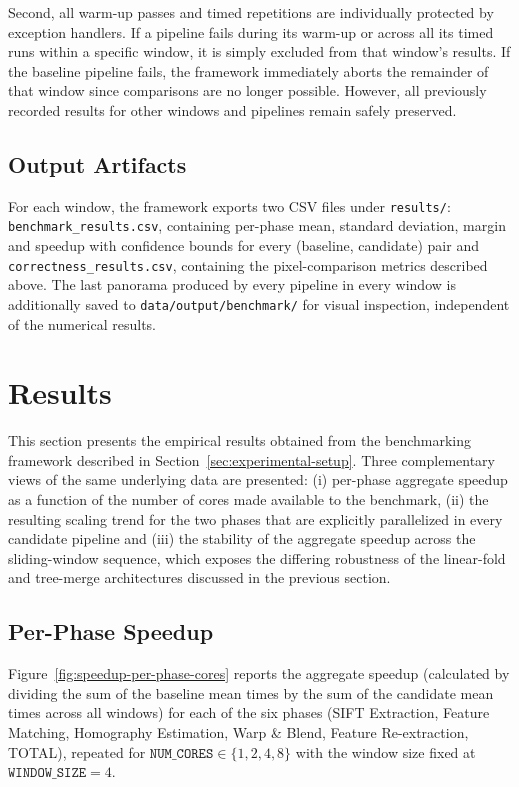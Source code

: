 \documentclass[10pt,twocolumn,letterpaper]{article}
\begin{document}
Second, all warm-up passes and timed repetitions are individually protected by exception handlers. 
If a pipeline fails during its warm-up or across all its timed runs within a specific window, it is simply excluded from that window's results. 
If the baseline pipeline fails, the framework immediately aborts the remainder of that window since comparisons are no longer possible. 
However, all previously recorded results for other windows and pipelines remain safely preserved.

\subsection{Output Artifacts}
For each window, the framework exports two CSV files under \texttt{results/}:
\texttt{benchmark\_results.csv}, containing per-phase mean, standard deviation, margin and
speedup with confidence bounds for every (baseline, candidate) pair and
\texttt{correctness\_results.csv}, containing the pixel-comparison metrics described above.
The last panorama produced by every pipeline in every window is additionally saved to
\texttt{data/output/benchmark/} for visual inspection, independent of the numerical results.

\section{Results}
\label{sec:results}

This section presents the empirical results obtained from the benchmarking framework described
in Section~\ref{sec:experimental-setup}. Three complementary views of the same underlying data
are presented: (i) per-phase aggregate speedup as a function of the number of cores made
available to the benchmark, (ii) the resulting scaling trend for the two phases that are
explicitly parallelized in every candidate pipeline and (iii) the stability of the aggregate
speedup across the sliding-window sequence, which exposes the differing robustness of the
linear-fold and tree-merge architectures discussed in the previous section.

\subsection{Per-Phase Speedup}
\label{sec:results-per-phase}

Figure~\ref{fig:speedup-per-phase-cores} reports the aggregate speedup (calculated 
by dividing the sum of the baseline mean times by the sum of the candidate mean 
times across all windows) for each of the six phases (SIFT Extraction, Feature 
Matching, Homography Estimation, Warp \& Blend, Feature Re-extraction, TOTAL), 
repeated for $\texttt{NUM\_CORES} \in \{1, 2, 4, 8\}$ with the window size 
fixed at $\texttt{WINDOW\_SIZE} = 4$.
\end{document}
